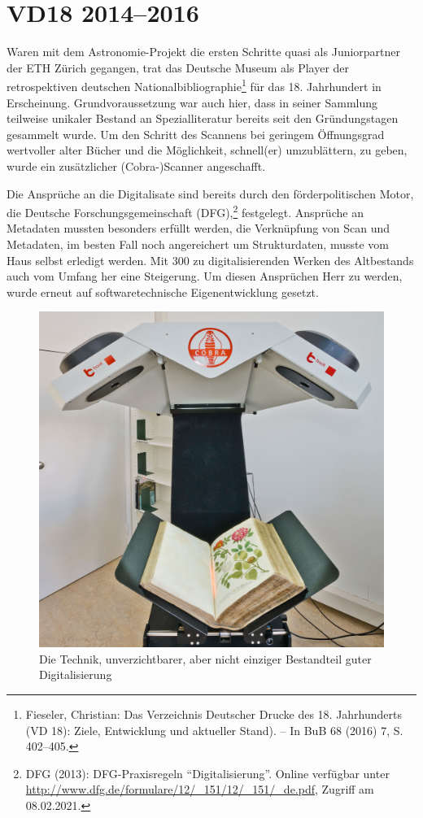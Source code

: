 \documentclass[a4paper,
fontsize=11pt,
oneside,
numbers=noperiodatend,
parskip=half-,
bibliography=totoc,
final
]{scrartcl}
\begin{document}
\hypertarget{vd18-20142016}{%
\section{VD18 2014--2016}\label{vd18-20142016}}

Waren mit dem Astronomie-Projekt die ersten Schritte quasi als
Juniorpartner der ETH Zürich gegangen, trat das Deutsche Museum als
Player der retrospektiven deutschen Nationalbibliographie\footnote{Fieseler,
  Christian: Das Verzeichnis Deutscher Drucke des 18. Jahrhunderts (VD
  18): Ziele, Entwicklung und aktueller Stand). -- In BuB 68 (2016) 7,
  S. 402--405.} für das 18. Jahrhundert in Erscheinung.
Grundvoraussetzung war auch hier, dass in seiner Sammlung teilweise
unikaler Bestand an Spezialliteratur bereits seit den Gründungstagen
gesammelt wurde. Um den Schritt des Scannens bei geringem Öffnungsgrad
wertvoller alter Bücher und die Möglichkeit, schnell(er) umzublättern,
zu geben, wurde ein zusätzlicher (Cobra-)Scanner angeschafft.

Die Ansprüche an die Digitalisate sind bereits durch den
förderpolitischen Motor, die Deutsche Forschungsgemeinschaft
(DFG),\footnote{DFG (2013): DFG-Praxisregeln \enquote{Digitalisierung}.
  Online verfügbar unter
  \url{http://www.dfg.de/formulare/12/_151/12/_151/_de.pdf}, Zugriff am
  08.02.2021.} festgelegt. Ansprüche an Metadaten mussten besonders
erfüllt werden, die Verknüpfung von Scan und Metadaten, im besten Fall
noch angereichert um Strukturdaten, musste vom Haus selbst erledigt
werden. Mit 300 zu digitalisierenden Werken des Altbestands auch vom
Umfang her eine Steigerung. Um diesen Ansprüchen Herr zu werden, wurde
erneut auf softwaretechnische Eigenentwicklung gesetzt.

\begin{figure}
\centering
\includegraphics[width=.6\textwidth]{img/Abb5.jpg}
\caption{Die Technik, unverzichtbarer, aber nicht einziger Bestandteil
guter Digitalisierung}
\end{figure}
\end{document}
